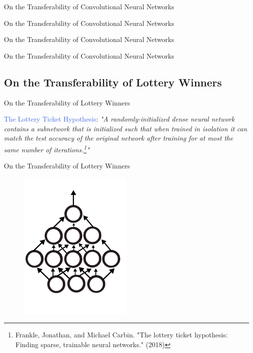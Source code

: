 \documentclass{beamer}
\begin{document}
\begin{frame}{On the Transferability of Convolutional Neural Networks}
\end{frame}


\begin{frame}{On the Transferability of Convolutional Neural Networks}
\end{frame}


\begin{frame}{On the Transferability of Convolutional Neural Networks}
\end{frame}


\begin{frame}{On the Transferability of Convolutional Neural Networks}
\end{frame}




\begin{frame}
	\subsection{On the Transferability of Lottery Winners}
\end{frame}


\begin{frame}{On the Transferability of Lottery Winners}

	\begin{center}
		\textcolor{RoyalBlue}{The Lottery Ticket Hypothesis}:
		\textit{"A randomly-initialized dense neural network contains a subnetwork that is initialized such that when trained in isolation it can match the test accuracy of the original network after training for at most the same number of iterations.\footnote{Frankle, Jonathan, and Michael Carbin. "The lottery ticket hypothesis: Finding sparse, trainable neural networks." (2018)}"}
	\end{center}

\end{frame}

\begin{frame}{On the Transferability of Lottery Winners}

	\begin{figure}
		\includegraphics[width=0.5\textwidth]{figures/mlp.pdf}
	\end{figure}

\end{frame}
\end{document}
